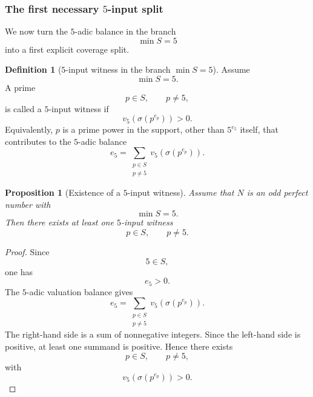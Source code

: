 \documentclass[11pt]{article}
\newtheorem{proposition}[theorem]{Proposition}
\theoremstyle{definition}
\newtheorem{definition}[theorem]{Definition}
\theoremstyle{remark}
\begin{document}
\subsubsection{The first necessary $5$-input split}

We now turn the $5$-adic balance in the branch
\[
  \min S=5
\]
into a first explicit coverage split.

\begin{definition}[$5$-input witness in the branch $\min S=5$]
Assume
\[
  \min S=5.
\]
A prime
\[
  p\in S,\qquad p\ne5,
\]
is called a $5$-input witness if
\[
  v_5(\sigma(p^{e_p}))>0.
\]
Equivalently, $p$ is a prime power in the support, other than $5^{e_5}$ itself,
that contributes to the $5$-adic balance
\[
  e_5
  =
  \sum_{\substack{p\in S\\p\ne5}}
  v_5(\sigma(p^{e_p})).
\]
\end{definition}

\begin{proposition}[Existence of a $5$-input witness]
\label{prop:q5-input-witness-exists}
Assume that $N$ is an odd perfect number with
\[
  \min S=5.
\]
Then there exists at least one $5$-input witness
\[
  p\in S,\qquad p\ne5.
\]
\end{proposition}

\begin{proof}
Since
\[
  5\in S,
\]
one has
\[
  e_5>0.
\]
The $5$-adic valuation balance gives
\[
  e_5
  =
  \sum_{\substack{p\in S\\p\ne5}}
  v_5(\sigma(p^{e_p})).
\]
The right-hand side is a sum of nonnegative integers.  Since the left-hand side
is positive, at least one summand is positive.  Hence there exists
\[
  p\in S,\qquad p\ne5,
\]
with
\[
  v_5(\sigma(p^{e_p}))>0.
\]
\end{proof}
\end{document}
